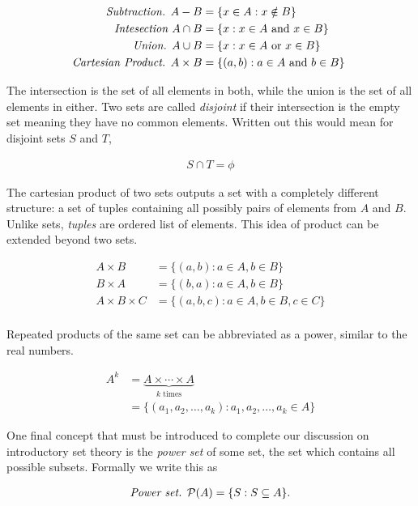 \documentclass[twoside]{report}
\begin{document}
\begin{align*}
	\emph{Subtraction. } A - B &= \{ x \in A : x \notin B \} \\
	\emph{Intesection } A \cap B &= \{ x : x \in A \text{ and } x \in B \} \\ 
	\emph{Union. } A  \cup B &= \{ x : x \in A \text{ or } x \in B \} \\
	\emph{Cartesian Product. } A  \times B &= \{ (a, b) : a \in A \text{ and } b \in B \} \
\end{align*}

The intersection is the set of all elements in both, while the union is the set of all elements in either. Two sets are called \emph{disjoint} if their intersection is the empty set meaning they have no common elements. Written out this would mean for disjoint sets $S$ and $T$,

\begin{align*}
	S \cap T = \phi
\end{align*}

The cartesian product of two sets outputs a set with a completely different structure: a set of tuples containing all possibly pairs of elements from $A$ and $B$. Unlike sets, \emph{tuples}  are ordered list of elements. This idea of product can be extended beyond two sets.

\begin{align*}
	A \times B &= \{ (a, b) : a \in A, b \in B \} \\
	B \times A &= \{ (b, a) : a \in A, b \in B \} \\
	A \times B \times C &= \{ (a, b, c) : a \in A, b \in B, c \in C \} \\
\end{align*}

Repeated products of the same set can be abbreviated as a power, similar to the real numbers.

\begin{align*}
	A^k &= \underbrace{A \times \cdots \times A}_\text{$k$ times} \\
	&= \{ (a_1, a_2, \dots, a_k) : a_1, a_2, \dots, a_k \in A \}
\end{align*} 

One final concept that must be introduced to complete our discussion on introductory set theory is the \emph{power set}  of some set, the set which contains all possible subsets. Formally we write this as

\begin{align*}
	\emph{Power set. } \mathcal{P}(A) = \{ S : S \subseteq A \}.
\end{align*}
\end{document}
